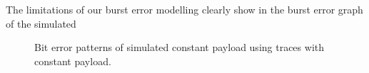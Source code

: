 The limitations of our burst error modelling clearly show in the burst error graph of the simulated 

\begin{figure}[ht]
	\caption{Bit error patterns of simulated constant payload using traces with constant payload.}
	\label{fig:8mote_bit_error_simulation}
\end{figure}

